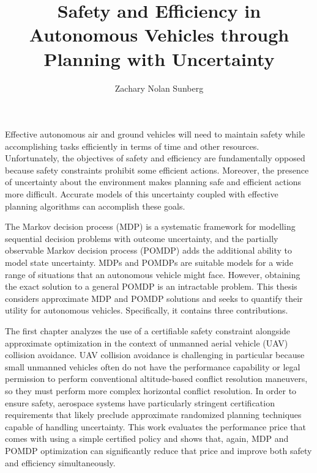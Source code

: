 \documentclass[12pt]{report}
\title{Safety and Efficiency in Autonomous Vehicles through Planning with Uncertainty}
\author{Zachary Nolan Sunberg}
\begin{document}
\beforepreface 


Effective autonomous air and ground vehicles will need to maintain safety while accomplishing tasks efficiently in terms of time and other resources.
Unfortunately, the objectives of safety and efficiency are fundamentally opposed because safety constraints prohibit some efficient actions.
Moreover, the presence of uncertainty about the environment makes planning safe and efficient actions more difficult.
Accurate models of this uncertainty coupled with effective planning algorithms can accomplish these goals.

The Markov decision process (MDP) is a systematic framework for modelling sequential decision problems with outcome uncertainty, and the partially observable Markov decision process (POMDP) adds the additional ability to model state uncertainty.
MDPs and POMDPs are suitable models for a wide range of situations that an autonomous vehicle might face.
However, obtaining the exact solution to a general POMDP is an intractable problem. %
This thesis considers approximate MDP and POMDP solutions and seeks to quantify their utility for autonomous vehicles.
Specifically, it contains three contributions.

The first chapter analyzes the use of a certifiable safety constraint alongside approximate optimization in the context of unmanned aerial vehicle (UAV) collision avoidance.
UAV collision avoidance is challenging in particular because small unmanned vehicles often do not have the performance capability or legal permission to perform conventional altitude-based conflict resolution maneuvers, so they must perform more complex horizontal conflict resolution.
In order to ensure safety, aerospace systems have particularly stringent certification requirements that likely preclude approximate randomized planning techniques capable of handling uncertainty.
This work evaluates the performance price that comes with using a simple certified policy and shows that, again, MDP and POMDP optimization can significantly reduce that price and improve both safety and efficiency simultaneously.
\end{document}
